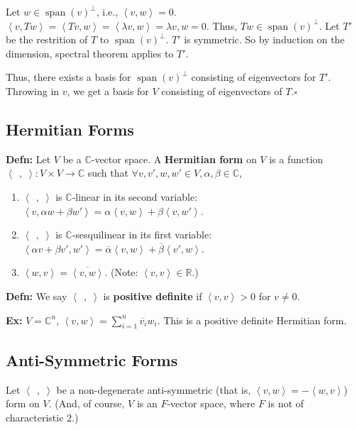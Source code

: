 \documentclass[10pt,letterpaper]{article}
\newcommand{\n}{\hfill\break}
\newcommand{\hangblock}[2]{\par\noindent\settowidth{\hangindent}{\textbf{#1: }}\textbf{#1: }\!\!\!#2}
\newcommand{\defn}[1]{\hangblock{Defn}{#1}}
\newcommand{\ex}[1]{\hangblock{Ex}{#1}}
\newcommand{\proven}{\;$\square$\n}
\newcommand{\reals}{\mathbb{R}}
\newcommand{\R}{\reals}
\newcommand{\complex}{\mathbb{C}}
\newcommand{\C}{\complex}
\newcommand{\conj}[1]{\overline{#1}}
\newcommand{\iprod}[1]{\left<#1\right>}
\newcommand{\giprod}{\iprod{\;\,,\;}}
\DeclareMathOperator{\vspan}{span}
\begin{document}
\par\noindent
Let $w\in\vspan(v)^{\perp}$, i.e., $\iprod{v,w}=0$. $\iprod{v,Tw}=\iprod{Tv,w}=\iprod{\lambda{}v,w}=\lambda{v,w}=0$. Thus, $Tw\in\vspan(v)^{\perp}$.\n
Let $T'$ be the restrition of $T$ to $\vspan(v)^{\perp}$. $T'$ is symmetric. So by induction on the dimension, spectral theorem applies to $T'$.\n

\par\noindent
Thus, there exists a basis for $\vspan(v)^{\perp}$ consisting of eigenvectors for $T'$. Throwing in $v$, we get a basis for $V$ consisting of eigenvectors of $T$.\proven

\subsection*{Hermitian Forms}

\defn{
	Let $V$ be a $\C$-vector space. A \textbf{Hermitian form} on $V$ is a function $\giprod:V\times{}V\to\C$ such that $\forall{}v,v',w,w'\in{}V,\alpha,\beta\in\C$,
	\begin{enumerate}[leftmargin=4\parindent]
		\item $\giprod$ is $\C$-linear in its second variable: $\iprod{v,\alpha{}w+\beta{}w'}=\alpha\iprod{v,w}+\beta\iprod{v,w'}$.
		\item $\giprod$ is $\C$-sesquilinear in its first variable: $\iprod{\alpha{}v+\beta{}v',w'}=\conj{\alpha}\iprod{v,w}+\conj{\beta}\iprod{v',w}$.
		\item $\iprod{w,v}=\conj{\iprod{v,w}}$. (Note: $\iprod{v,v}\in\R$.)
	\end{enumerate}
}

\defn{
	We say $\giprod$ is \textbf{positive definite} if $\iprod{v,v}>0$ for $v\ne{}0$.\n
}

\ex{
	$V=\C^{n}$, $\iprod{v,w}=\sum_{i=1}^{n}\conj{v_{i}}w_{i}$.\n
	This is a positive definite Hermitian form.\n
}

\subsection*{Anti-Symmetric Forms}

\par\noindent
Let $\giprod$ be a non-degenerate anti-symmetric (that is, $\iprod{v,w}=-\iprod{w,v}$) form on $V$. (And, of course, $V$ is an $F$-vector space, where $F$ is not of characteristic $2$.)\n
\end{document}
